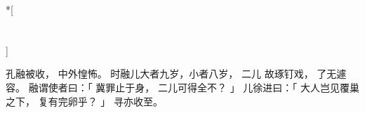 
\switchcolumn[0]*[\section{}]

孔融被收，
中外惶怖。
时融儿大者九岁，小者八岁，
二儿
故琢钉戏，
了无遽容。
融谓使者曰：「
    冀罪止于身，
    二儿可得全不？
」
儿徐进曰：「
    大人岂见覆巢之下，
    复有完卵乎？
」
寻亦收至。

\switchcolumn



